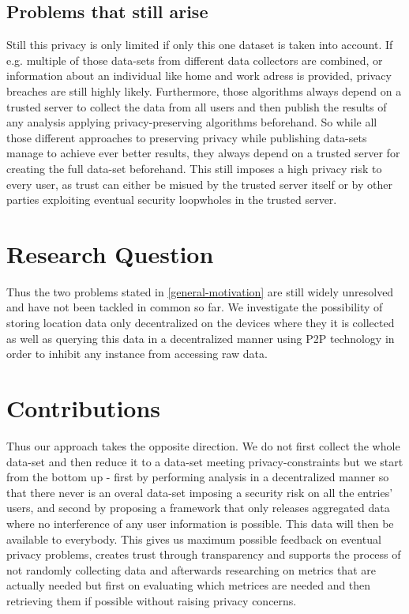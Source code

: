\subsection{Problems that still arise}

Still this privacy is only limited if only this one dataset is taken into account. If e.g. multiple of those data-sets from different data collectors are combined, or information about an individual like home and work adress is provided, privacy breaches are still highly likely.
Furthermore, those algorithms always depend on a trusted server to collect the data from all users and then publish the results of any analysis applying privacy-preserving algorithms beforehand. So while all those different approaches to preserving privacy while publishing data-sets manage to achieve ever better results, they always depend on a trusted server for creating the full data-set beforehand. This still imposes a high privacy risk to every user, as trust can either be misued by the trusted server itself or by 
other parties exploiting eventual security loopwholes in the trusted server. 

\section{Research Question}
Thus the two problems stated in \ref{general-motivation} are still widely unresolved and have not been tackled in common so far. We investigate the possibility of storing location data only decentralized on the devices where they it is collected as well as querying this data in a decentralized manner using P2P technology in order to inhibit any instance from accessing raw data.

\section{Contributions}

Thus our approach takes the opposite direction. We do not first collect the whole data-set and then reduce it to a data-set meeting privacy-constraints but we start from the bottom up - first by performing analysis in a decentralized manner so that there never is an overal data-set imposing a security risk on all the entries' users, and second by proposing a framework that only releases aggregated data where no interference of any user information is possible. This data will then be available to everybody. This gives us maximum possible feedback on eventual privacy problems, creates trust through transparency and supports the process of not randomly collecting data and afterwards researching on metrics that are actually needed but first on evaluating which metrices are needed and then retrieving them if possible without raising privacy concerns.

